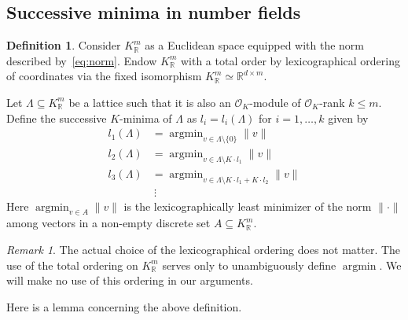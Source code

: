 \documentclass{amsart}
\newtheorem{lemma}[theorem]{Lemma}
\theoremstyle{definition}
\newtheorem{definition}[theorem]{Definition}
\theoremstyle{remark}
\newtheorem{remark}[theorem]{Remark}
\newcommand{\OK}{\mathcal{O}_K}
\newcommand{\KR}{K_\mathbb{R}}
\DeclareMathOperator{\argmin}{argmin}
\begin{document}
\subsection{Successive minima in number fields}


\begin{definition}
    Consider $\KR^{m}$ as a Euclidean space equipped with the norm described by~\cref{eq:norm}. 
Endow $\KR^{m}$ with a total order by lexicographical ordering of coordinates via the fixed isomorphism $\KR^{m} \simeq \mathbb{R}^{d \times m}$.
    
Let $\Lambda \subseteq \KR^{m}$ be a lattice such that it is also an $\OK$-module of $\OK$-rank $k \leq m$. 
    Define the successive $K$-minima of $\Lambda$ as
    $l_i = l_i(\Lambda)$ for 
    $i=1,\dots,k$ given by 
    \begin{align}
        l_1(\Lambda) &  = \argmin_{v \in \Lambda \setminus \{0\} } \|v\| \\
        l_2(\Lambda)  & = \argmin_{v \in \Lambda \setminus K\cdot l_1  } \|v\| \\
        l_3(\Lambda)  & = \argmin_{v \in \Lambda \setminus K \cdot l_1 + K \cdot l_2  } \|v\| \\
                      &~\vdots
    \end{align}
    \label{de:defi_of_successive}
    Here $\argmin_{v \in A} \|v\|$ is the lexicographically least minimizer of the norm $\| \cdot\|$ among vectors in a non-empty discrete set $A \subseteq \KR^{m}$.
\end{definition}
\begin{remark}
The actual choice of the lexicographical ordering does not matter. The use of the total ordering on $\KR^{m}$ serves only to unambiguously define $\argmin$. We will make no use of this ordering in our arguments.
\end{remark}
Here is a lemma concerning the above definition.
\end{document}
